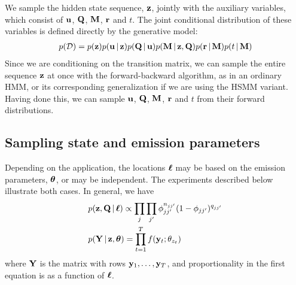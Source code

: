 We sample the hidden state sequence, $\mathbf{z}$, jointly with the auxiliary
variables, which consist of $\mathbf{u}$, $\mathbf{Q}$, $\mathbf{M}$, $\mathbf{r}$ and $t$.  The
joint conditional distribution of these variables is defined directly
by the generative model:
\begin{align*}
  p(\mathcal{D}) = p(\mathbf{z}) p(\mathbf{u} \, \vert \, \mathbf{z}) p(\mathbf{Q} \, \vert \,
  \mathbf{u}) p(\mathbf{M} \, \vert \, \mathbf{z}, \mathbf{Q}) p(\mathbf{r} \, \vert \, \mathbf{M}) p(t
  \, \vert \,\mathbf{M})
\end{align*}
Since we are conditioning on the transition matrix, we can
sample the entire sequence $\mathbf{z}$ at once with the forward-backward algorithm,
as in an ordinary HMM, or its corresponding generalization if we are
using the HSMM variant.  Having done this, we can sample $\mathbf{u}$, $\mathbf{Q}$, $\mathbf{M}$,
$\mathbf{r}$ and $t$ from their forward distributions.

\subsection{Sampling state and emission parameters}
\label{sec:sampling-eta}

Depending on the application, the locations $\boldsymbol{\ell}$ may be based
on the emission parameters, $\boldsymbol{\theta}$, or may be independent.
The experiments described below illustrate both cases.
In general, we have
\begin{align}
  \label{eq:65}
  &p(\mathbf{z}, \mathbf{Q} \, \vert \, \boldsymbol{\ell}) \propto \prod_{j}\prod_{j'}
  \phi_{jj'}^{n_{jj'}}(1-\phi_{jj'})^{q_{jj'}} \\
  &p(\mathbf{Y} \, \vert \, \mathbf{z}, \boldsymbol{\theta}) = \prod_{t=1}^T f(\mathbf{y}_t; \theta_{z_t})
\end{align}
where $\mathbf{Y}$ is the matrix with rows $\mathbf{y}_1, \dots, \mathbf{y}_T$, and 
proportionality in the first equation is as a function of $\boldsymbol{\ell}$.



